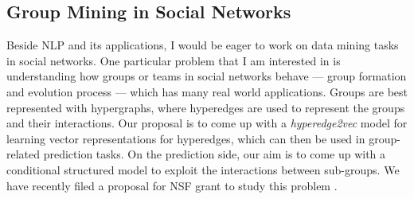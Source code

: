 \documentclass{article} %
\begin{document}
\subsection{Group Mining in Social Networks}

Beside NLP and its applications, I would be eager to work on data mining tasks in social networks. One particular problem that I am interested in is understanding how groups or teams in social networks behave --- group formation and evolution process --- which has many real world applications.  Groups are best represented with hypergraphs, where hyperedges are used to represent the groups and their interactions. Our proposal is to come up with a \emph{hyperedge2vec} model for learning vector representations for hyperedges, which can then be used in group-related prediction tasks. On the prediction side, our aim is to come up with a conditional structured model to exploit the interactions between sub-groups. We have recently filed a proposal for NSF grant to study this problem \cite{NSF_group}.


     





\end{document}
